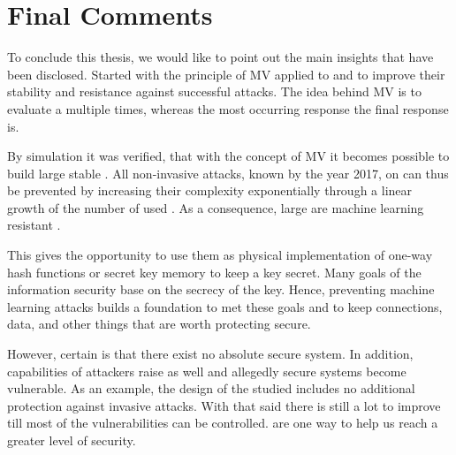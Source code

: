 
\section{Final Comments}

To conclude this thesis, we would like to point out the main insights that have been disclosed.
Started with the principle of \ac{MV} applied to \apufs and \xpufs to improve their stability and resistance against successful attacks.
The idea behind \ac{MV} is to evaluate a \puf multiple times, whereas the most occurring response the final response is.

By simulation it was verified, that with the concept of \ac{MV} it becomes possible to build large stable \mxpufs.
All non-invasive attacks, known by the year 2017, on \xpufs can thus be prevented by increasing their complexity exponentially through a linear growth of the number of used \mpufs.
As a consequence, large \mxpufs are machine learning resistant \pufs.

This gives the opportunity to use them as physical implementation of one-way hash functions or secret key memory to keep a key secret.
Many goals of the information security base on the secrecy of the key.
Hence, preventing machine learning attacks builds a foundation to met these goals and to keep connections, data, and other things that are worth protecting secure.

However, certain is that there exist no absolute secure system.
In addition, capabilities of attackers raise as well and allegedly secure systems become vulnerable.
As an example, the design of the studied \apuf includes no additional protection against invasive attacks.
With that said there is still a lot to improve till most of the vulnerabilities can be controlled.
\pufs are one way to help us reach a greater level of security.

